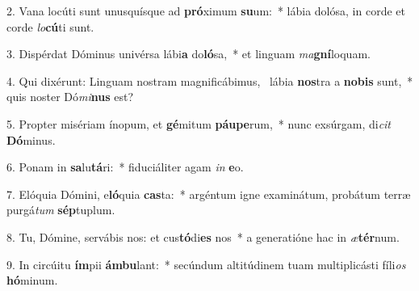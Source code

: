 2. Vana locúti sunt unusquísque ad \textbf{pró}ximum \textbf{su}um:~*  lábia dolósa, in corde et corde \textit{lo}\textbf{cú}ti sunt.\

3. Dispérdat Dóminus univérsa lábi\textbf{a} do\textbf{ló}sa,~*  et linguam \textit{ma}\textbf{gní}loquam.\

4. Qui dixérunt: Linguam nostram magnificábimus, \dag\  lábia \textbf{nos}tra a \textbf{no}\textbf{bis} sunt,~*  quis noster Dó\textit{mi}\textbf{nus} est?\

5. Propter misériam ínopum, et \textbf{gé}mitum \textbf{páu}\textbf{pe}rum,~*  nunc exsúrgam, di\textit{cit} \textbf{Dó}minus.\

6. Ponam in \textbf{sa}lu\textbf{tá}ri:~*  fiduciáliter agam \textit{in} \textbf{e}o.\

7. Elóquia Dómini, e\textbf{ló}quia \textbf{cas}ta:~*  argéntum igne examinátum, probátum terræ purgá\textit{tum} \textbf{sép}tuplum.\

8. Tu, Dómine, servábis nos: et cus\textbf{tó}di\textbf{es} nos~*  a generatióne hac in \textit{æ}\textbf{tér}num.\

9. In circúitu \textbf{ím}pii \textbf{ám}\textbf{bu}lant:~*  secúndum altitúdinem tuam multiplicásti fíli\textit{os} \textbf{hó}minum.\


